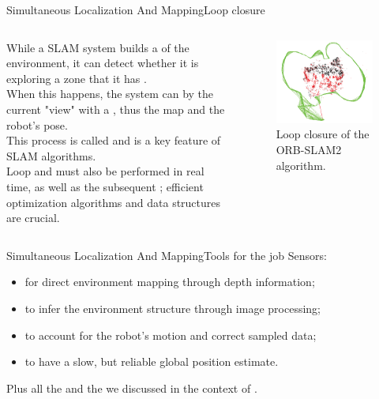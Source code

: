 \begin{frame}{Simultaneous Localization And Mapping}{Loop closure}
  \begin{columns}
    While a SLAM system builds a  of the environment, it can detect whether it is exploring a zone that it has .\\
    \medskip
    When this happens, the system can  by  the current "view" with a , thus  the map and the robot's pose.\\
    \medskip
    This process is called  and is a key feature of SLAM algorithms.\\
    \medskip
    Loop  and  must also be performed in real time, as well as the subsequent ; efficient optimization algorithms and data structures are crucial.

    \begin{figure}
      \centering
      \includegraphics[width=.8\textwidth]{orbgraph}
      \caption{Loop closure of the ORB-SLAM2 algorithm.}
      \label{fig:loopclosure}
    \end{figure}
  \end{columns}
\end{frame}
\begin{frame}{Simultaneous Localization And Mapping}{Tools for the job}
  Sensors:
	\begin{itemize}
		\item {} for direct environment mapping through depth information;
		\item {} to infer the environment structure through image processing;
		\item {} to account for the robot's motion and correct sampled data;
		\item {} to have a slow, but reliable global position estimate.
	\end{itemize}
  \medskip
  Plus all the  and the  we discussed in the context of .
\end{frame}
